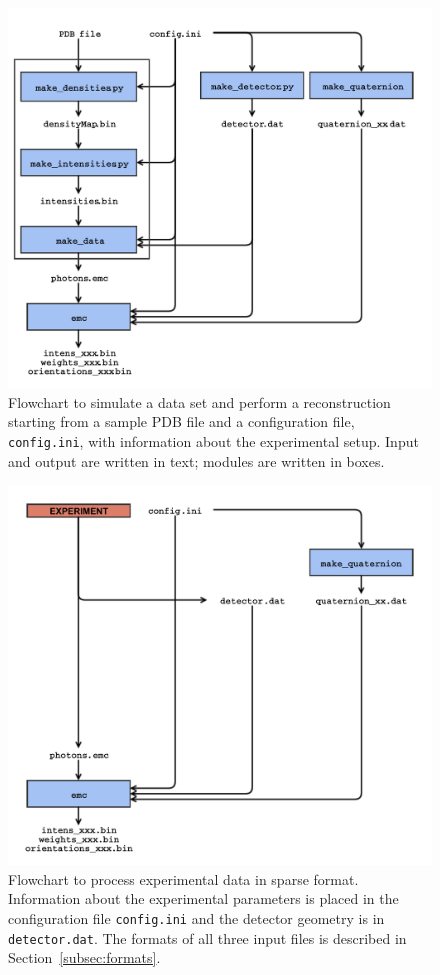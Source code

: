 \documentclass[]{iucr}              %
\begin{document}
\begin{figure}
\caption{Flowchart to simulate a data set and perform a reconstruction starting from a sample PDB file and a configuration file, \texttt{config.ini}, with information about the experimental setup. Input and output are written in text; modules are written in boxes.}\label{fig:simFlowchart}
\includegraphics[width=\textwidth]{figures/emc_sim.pdf}
\end{figure}

\begin{figure}
\caption{Flowchart to process experimental data in sparse format. Information about the experimental parameters is placed in the configuration file \texttt{config.ini} and the detector geometry is in \texttt{detector.dat}. The formats of all three input files is described in Section~\ref{subsec:formats}.}\label{fig:expFlowchart}
\includegraphics[width=\textwidth]{figures/emc_exp.pdf}
\end{figure}
\end{document}
